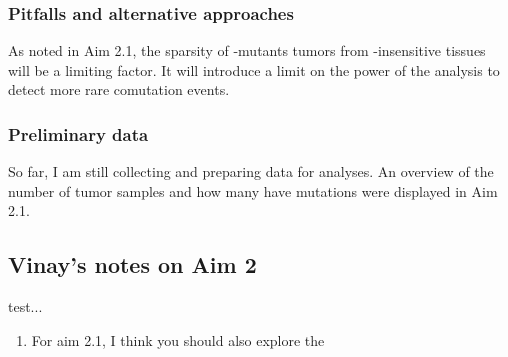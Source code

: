 \subsubsection*{Pitfalls and alternative approaches}

As noted in Aim 2.1, the sparsity of \KRAS{}-mutants tumors from \KRAS{}-insensitive tissues will be a limiting factor.
It will introduce a limit on the power of the analysis to detect more rare comutation events.

\subsubsection*{Preliminary data}

So far, I am still collecting and preparing data for analyses.
An overview of the number of tumor samples and how many have \KRAS{} mutations were displayed in Aim 2.1.

\subsection*{Vinay's notes on Aim 2}

{\color{red} test...

\begin{enumerate}
\item For aim 2.1, I think you should also explore the 
\end{enumerate}

}